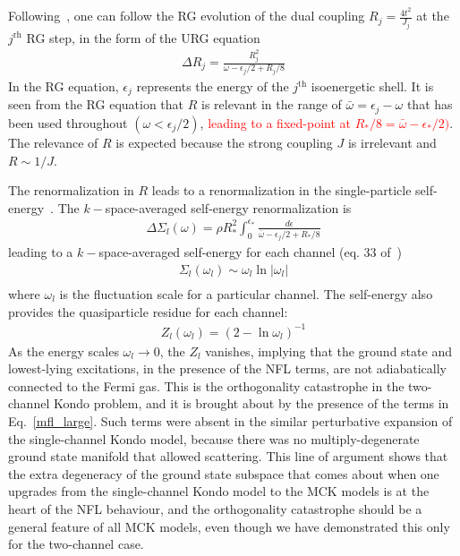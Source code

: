 \documentclass[reprint,prb,superscriptaddress]{revtex4-2}
\begin{document}
Following~\cite{anirbanmott1}, one can follow the RG evolution of the dual coupling \(R_j = \frac{4t^2}{J_j}\) at the \(j^\text{rh}\) RG step, in the form of the URG equation
\begin{equation}\begin{aligned}
	\Delta R_j = \frac{R_j^2}{\omega - \epsilon_{j}/2 + R_j/8}
\end{aligned}\end{equation}
In the RG equation, \(\epsilon_{j}\) represents the energy of the \(j^\text{th}\) isoenergetic shell. It is seen from the RG equation that \(R\) is relevant in the range of \(\bar\omega = \epsilon_j -\omega\) that has been used throughout \((\omega < \epsilon_j/2)\), \textcolor{red}{leading to a fixed-point at \(R_*/8 = \bar\omega - \epsilon_*/2)\)}. The relevance of \(R\) is expected because the strong coupling \(J\) is irrelevant and \(R \sim 1/J\).

The renormalization in \(R\) leads to a renormalization in the single-particle self-energy~\cite{anirbanmott1}. The \(k-\)space-averaged self-energy renormalization is
\begin{equation}\begin{aligned}
	\Delta \Sigma_l(\omega) = \rho R_*^2\int_0^{\epsilon_*} \frac{d\epsilon}{\bar\omega - \epsilon_j/2 + R_*/8}
\end{aligned}\end{equation}
leading to a \(k-\)space-averaged self-energy for each channel (eq. 33 of~\cite{anirbanmott1})
\begin{equation}\begin{aligned}
	\label{self_energy}
	\Sigma_l(\omega_l) \sim \omega_l \ln |\omega_l|\\
\end{aligned}\end{equation}
where \(\omega_l\) is the fluctuation scale for a particular channel. The self-energy also provides the quasiparticle residue for each channel\cite{anirbanmott1}:
\begin{equation}\begin{aligned}
	Z_l(\omega_l) = \left(2 - \ln \omega_l\right) ^{-1}
\end{aligned}\end{equation}
As the energy scales \(\omega_l \to 0\), the \(Z_l\) vanishes, implying that the ground state and lowest-lying excitations, in the presence of the NFL terms, are not adiabatically connected to the Fermi gas. This is the orthogonality catastrophe in the two-channel Kondo problem, and it is brought about by the presence of the terms in Eq.~\ref{mfl_large}. Such terms were absent in the similar perturbative expansion of the single-channel Kondo model, because there was no multiply-degenerate ground state manifold that allowed scattering. This line of argument shows that the extra degeneracy of the ground state subspace that comes about when one upgrades from the single-channel Kondo model to the MCK models is at the heart of the NFL behaviour, and the orthogonality catastrophe should be a general feature of all MCK models, even though we have demonstrated this only for the two-channel case.
\end{document}
